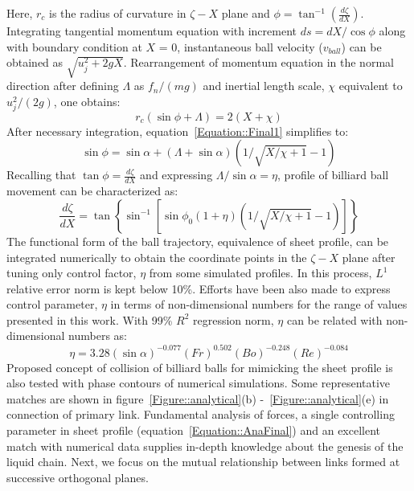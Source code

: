 \documentclass{jfm}
\begin{document}
Here, $r_c$ is the radius of curvature in $\zeta-X$ plane and $\phi = \tan^{-1}\left(\frac{d\zeta}{dX}\right)$. Integrating tangential momentum equation with increment $ds = dX/\cos\phi$ along with boundary condition at $X$ = 0, instantaneous ball velocity ($v_{ball}$) can be obtained as $\sqrt{u_j^2 + 2gX}$. Rearrangement of momentum equation in the normal direction after defining $\Lambda$ as $f_n/(mg)$ and inertial length scale, $\chi$ equivalent to $u_j^2/(2g)$, one obtains:
\begin{equation}\label{Equation::Final1}
r_c\left(\sin\phi + \Lambda\right) = 2(X + \chi)
\end{equation} 
After necessary integration, equation~\ref{Equation::Final1} simplifies to:
\begin{equation}
\sin\phi  = \sin\alpha + \left(\Lambda + \sin\alpha\right)\left(1/\sqrt{X/\chi + 1} - 1\right)	
\end{equation}
Recalling that $\tan\phi = \frac{d\zeta}{dX}$ and expressing $\Lambda/\sin\alpha = \eta$, profile of billiard ball movement can be characterized as:
\begin{equation}
\label{Equation::AnaFinal}
\frac{d\zeta}{dX} = \tan\left\lbrace\sin^{-1}\left[ \sin\phi_0\left(1 + \eta\right)\left(1/\sqrt{X/\chi + 1} - 1\right) \right]\right\rbrace
\end{equation}
The functional form of the ball trajectory, equivalence of sheet profile, can be integrated numerically to obtain the coordinate points in the $\zeta-X$ plane after tuning only control factor, $\eta$ from some simulated profiles. In this process, $L^1$ relative error norm is kept below 10\%. Efforts have been also made to express control parameter, $\eta$ in terms of non-dimensional numbers for the range of values presented in this work. With 99\% $R^2$ regression norm, $\eta$ can be related with non-dimensional numbers as:
\begin{equation}\label{Equation::eta}
\eta = 3.28(\sin\alpha)^{-0.077}(Fr)^{0.502}(Bo)^{-0.248}\left(Re\right)^{-0.084}
\end{equation}
Proposed concept of collision of billiard balls for mimicking the sheet profile is also tested with phase contours of numerical simulations. Some representative matches are shown in figure~\ref{Figure::analytical}(b) -~\ref{Figure::analytical}(e) in connection of primary link. Fundamental analysis of forces, a single controlling parameter in sheet profile (equation~\ref{Equation::AnaFinal}) and an excellent match with numerical data supplies in-depth knowledge about the genesis of the liquid chain. Next, we focus on the mutual relationship between links formed at successive orthogonal planes. 
\end{document}

